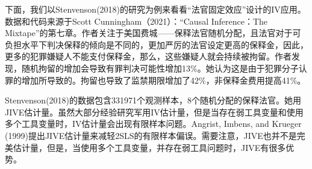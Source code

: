 \documentclass[cn,12pt,math=newtx,citestyle=gb7714-2015,bibstyle=gb7714-2015]{elegantbook}
\begin{document}
	下面，我们以Stenvenson(2018)的研究为例来看看“法官固定效应”设计的IV应用。数据和代码来源于Scott Cunningham（2021）：“Causal Inference：The Mixtape”的第七章。作者关注于美国费城——保释法官随机分配，且法官对于可负担水平下判决保释的倾向是不同的，更加严厉的法官设定更高的保释金，因此，更多的犯罪嫌疑人不能支付保释金，那么，这些嫌疑人就会持续被拘留。作者发现，随机拘留的增加会导致有罪判决可能性增加13\%。她认为这是由于犯罪分子认罪的增加所导致的。拘留也导致了监禁期限增加了42\%，非保释金费用提高41\%。
	
	Stenvenson(2018)的数据包含331971个观测样本，8个随机分配的保释法官。她用JIVE估计量。虽然大部分经验研究军用IV估计量，但是当存在弱工具变量和使用多个工具变量时，IV估计量会出现有限样本问题。Angrist, Imbens, and Krueger (1999)提出JIVE估计量来减轻2SLS的有限样本偏误。需要注意，JIVE也并不是完美估计量，但是，当使用多个工具变量，并存在弱工具问题时，JIVE有很多优势。
	
\end{document}
